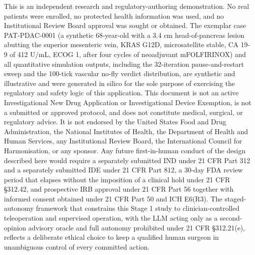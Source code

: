 This is an independent research and regulatory-authoring demonstration. No real
patients were enrolled, no protected health information was used, and no
Institutional Review Board approval was sought or obtained. The exemplar case
PAT-PDAC-0001 (a synthetic 68-year-old with a 3.4 cm head-of-pancreas lesion
abutting the superior mesenteric vein, KRAS G12D, microsatellite stable, CA 19-9
of 412 U/mL, ECOG 1, after four cycles of neoadjuvant mFOLFIRINOX) and all
quantitative simulation outputs, including the 32-iteration pause-and-restart sweep
and the 100-tick vascular no-fly verdict distribution, are synthetic and
illustrative and were generated in silico for the sole purpose of exercising the
regulatory and safety logic of this application. This document is not an active
Investigational New Drug Application or Investigational Device Exemption, is not a
submitted or approved protocol, and does not constitute medical, surgical, or
regulatory advice. It is not endorsed by the United States Food and Drug
Administration, the National Institutes of Health, the Department of Health and
Human Services, any Institutional Review Board, the International Council for
Harmonisation, or any sponsor. Any future first-in-human conduct of the design
described here would require a separately submitted IND under 21 CFR Part 312 and a
separately submitted IDE under 21 CFR Part 812, a 30-day FDA review period that
elapses without the imposition of a clinical hold under 21 CFR \S 312.42, and
prospective IRB approval under 21 CFR Part 56 together with informed consent
obtained under 21 CFR Part 50 and ICH E6(R3). The staged-autonomy framework that
constrains this Stage 1 study to clinician-controlled teleoperation and supervised
operation, with the LLM acting only as a second-opinion advisory oracle and full
autonomy prohibited under 21 CFR \S 312.21(e), reflects a deliberate ethical choice
to keep a qualified human surgeon in unambiguous control of every committed action.

